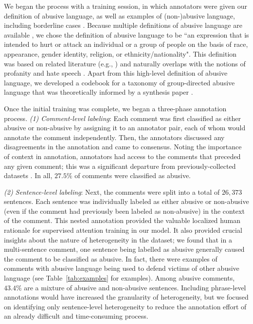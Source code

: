 \documentclass[letterpaper]{article} %
\begin{document}
We began the process with a training session, in which annotators were given our definition of abusive language, as well as examples of (non-)abusive language, including borderline cases \cite{vidgen2019challenges}.
 Because multiple definitions of abusive language are available \cite{fortuna2018survey,peter2018cyberbullying}, we chose the definition of abusive language to be ``an expression that is
intended to hurt or attack an individual or a group of people on the basis of race, appearance, gender identity, religion, or ethnicity/nationality".
This definition was based on related literature (e.g., \cite{nobata2016abusive}) and naturally overlaps with the notions of profanity and hate speech \cite{nockleby2000hate}.
Apart from this high-level definition of abusive language, we developed a  codebook for a taxonomy of group-directed abusive language that was theoretically informed by a synthesis paper \cite{patchin2015measuring}.

Once the initial training was complete, we began a three-phase annotation process.
\textit{(1) Comment-level labeling}: Each comment was first classified as either abusive or non-abusive by
assigning it to an annotator pair, each of whom would annotate the comment independently.
Then, the annotators discussed any disagreements in the annotation and came to consensus.
Noting the importance of context in annotation, annotators had access to the comments that preceded any given comment; this was a significant departure from previously-collected datasets \cite{vidgen2019challenges}.  In all, $27.5\%$ of comments were classified as abusive.

 \textit{(2) Sentence-level labeling}: Next, the comments were split into a total of $26,373$ sentences. Each sentence was individually labeled as either abusive or non-abusive (even if the comment had previously been labeled as non-abusive) in the context of the comment. This nested annotation provided the valuable localized human rationale for supervised attention training in our model.
It also provided crucial insights about the nature of heterogeneity in the dataset; we found that in a multi-sentence comment, one sentence being labelled as abusive generally caused the  comment to be classified as abusive.
In fact, there were examples of comments with abusive language being used to defend victims of other abusive language (see Table~\ref{tab:examples} for examples). Among abusive comments, $43.4\%$ are a mixture of abusive and non-abusive sentences.
Including phrase-level annotations would have increased the granularity of heterogeneity, but we focused on identifying only sentence-level heterogeneity to reduce the annotation effort of an already difficult and time-consuming process.
\end{document}
